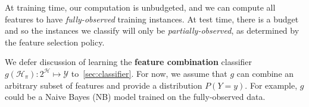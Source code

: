 

At training time, our computation is unbudgeted, and we can compute all features to have \emph{fully-observed} training instances.
At test time, there is a budget and so the instances we classify will only be \emph{partially-observed}, as determined by the feature selection policy.

We defer discussion of learning the \textbf{feature combination} classifier $g(\mathcal{H}_\pi) : 2^\mathcal{H} \mapsto \mathcal{Y}$ to~\autoref{sec:classifier}.
For now, we assume that $g$ can combine an arbitrary subset of features and provide a distribution $P(Y = y)$.
For example, $g$ could be a Naive Bayes (NB) model trained on the fully-observed data.



